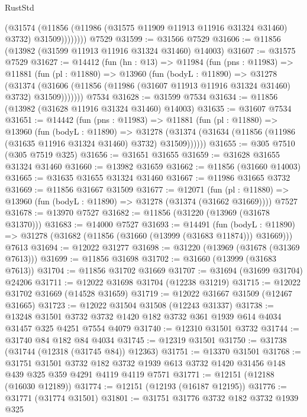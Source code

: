 \begin{lexlean}{RustStd}
\begin{coremodule}
                (@31574
                  (@11856 (@11986 (@31575 @11909 @11913 @11916 @31324 @31460) @3732) @31509))))))))
    @7529
@31599 := @31566 @7529
@31606 := @11856 (@13982 (@31599 @11913 @11916 @31324 @31460) @14003)
@31607 := @31575 @7529
@31627 := @14412
    (fun (hn : @13) =>
    @11984
      (fun (pns : @11983) =>
      @11881
        (fun (pl : @11880) =>
        @13960
          (fun (bodyL : @11890) =>
          @31278
            (@31374
              (@31606 (@11856 (@11986 (@31607 @11913 @11916 @31324 @31460) @3732) @31509)))))))
    @7534
@31628 := @31599 @7534
@31634 := @11856 (@13982 (@31628 @11916 @31324 @31460) @14003)
@31635 := @31607 @7534
@31651 := @14442
    (fun (pns : @11983) =>
    @11881
      (fun (pl : @11880) =>
      @13960
        (fun (bodyL : @11890) =>
        @31278 (@31374 (@31634 (@11856 (@11986 (@31635 @11916 @31324 @31460) @3732) @31509))))))
@31655 := @305 @7510 (@305 @7519 @325)
@31656 := @31651 @31655
@31659 := @31628 @31655 @31324 @31460
@31660 := @13982 @31659
@31662 := @11856 (@31660 @14003)
@31665 := @31635 @31655 @31324 @31460
@31667 := @11986 @31665 @3732
@31669 := @11856 @31667 @31509
@31677 := @12071
    (fun (pl : @11880) => @13960 (fun (bodyL : @11890) => @31278 (@31374 (@31662 @31669))))
    @7527
@31678 := @13970 @7527
@31682 := @11856 (@31220 (@13969 (@31678 @31370)))
@31683 := @14000 @7527
@31693 := @14491
    (fun (bodyL : @11890) => @31278 (@31682 (@11856 (@31660 (@13999 (@31683 @11874))) @31669)))
    @7613
@31694 := @12022 @31277
@31698 := @31220 (@13969 (@31678 (@31369 @7613)))
@31699 := @11856 @31698
@31702 := @31660 (@13999 (@31683 @7613))
@31704 := @11856 @31702 @31669
@31707 := @31694 (@31699 @31704) @24206
@31711 := @12022 @31698 @31704 (@12238 @31219)
@31715 := @12022 @31702 @31669 (@14528 @31659)
@31719 := @12022 @31667 @31509 (@12467 @31665)
@31723 := @12022 @31504 @31508 (@12243 @31337)
@31738 := @13248
    @31501
    @3732
    @3732
    @1420
    @182
    @3732
    @361
    @1939
    @614
    @4034
    @31457
    @325
    @4251
    @7554
    @4079
@31740 := @12310 @31501 @3732
@31744 := @31740 @84 @182 @84 @4034
@31745 := @12319 @31501
@31750 := @31738 (@31744 (@12318 (@31745 @84)) @12363)
@31751 := @13370 @31501
@31768 := @31751
    @31501
    @3732
    @182
    @3732
    @1939
    @613
    @3732
    @1420
    @31456
    @148
    @439
    @325
    @359
    @4291
    @4119
    @4119
    @7571
@31771 := @12151 (@12188 (@16030 @12189))
@31774 := @12151 (@12193 (@16187 @12195))
@31776 := @31771 (@31774 @31501)
@31801 := @31751
    @31776
    @3732
    @182
    @3732
    @1939
    @325

\end{coremodule}
\end{lexlean}
